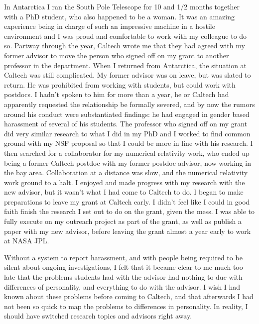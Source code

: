 \documentclass[utf8]{frontiersSCNS} %
\begin{document}
In Antarctica I ran the South Pole Telescope for 10 and 1/2 months together with a PhD student, who also happened to be a woman. It was an amazing experience being in charge of such an impressive machine in a hostile environment and I was proud and comfortable to work with my colleague to do so. Partway through the year, Caltech wrote me that they had agreed with my former advisor to move the person who signed off on my grant to another professor in the department. When I returned from Antarctica, the situation at Caltech was still complicated. My former advisor was on leave, but was slated to return. He was prohibited from working with students, but could work with postdocs. I hadn't spoken to him for more than a year, he or Caltech had apparently requested the relationship be formally severed, and by now the rumors around his conduct were substantiated findings: he had engaged in gender based harassment of several of his students. The professor who signed off on my grant did very similar research to what I did in my PhD and I worked to find common ground with my NSF proposal so that I could be more in line with his research. I then searched for a collaborator for my numerical relativity work, who ended up being a former Caltech postdoc with my former postdoc advisor, now working in the bay area. Collaboration at a distance was slow, and the numerical relativity work ground to a halt. I enjoyed and made progress with my research with the new advisor, but it wasn't what I had come to Caltech to do. I began to make preparations to leave my grant at Caltech early. I didn't feel like I could in good faith finish the research I set out to do on the grant, given the mess. I was able to fully execute on my outreach project as part of the grant, as well as publish a paper with my new advisor, before leaving the grant almost a year early to work at NASA JPL.

Without a system to report harassment, and with people being required to be silent about ongoing investigations, I felt that it became clear to me much too late that the problems students had with the advisor had nothing to due with differences of personality, and everything to do with the advisor. I wish I had known about these problems before coming to Caltech, and that afterwards I had not been so quick to map the problems to differences in personality. In reality, I should have switched research topics and advisors right away. 
\end{document}
